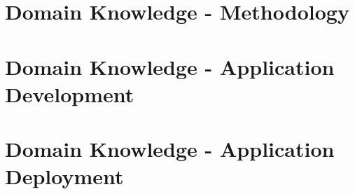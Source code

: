 \documentclass[10pt,a4paper,b ibliography=totoc]{scrbook}
\begin{document}

\part{Domain Knowledge - Methodology}  

%
\part{Domain Knowledge - Application Development}  







\part{Domain Knowledge - Application Deployment} 
 


\part{}



    

%
%

%
%
%

%
%

\printbibliography[
  heading=bibintoc,
  title={\TRANS{Literaturverzeichnis}{Literature}}
]

\newpage

\printindex
\end{document}
